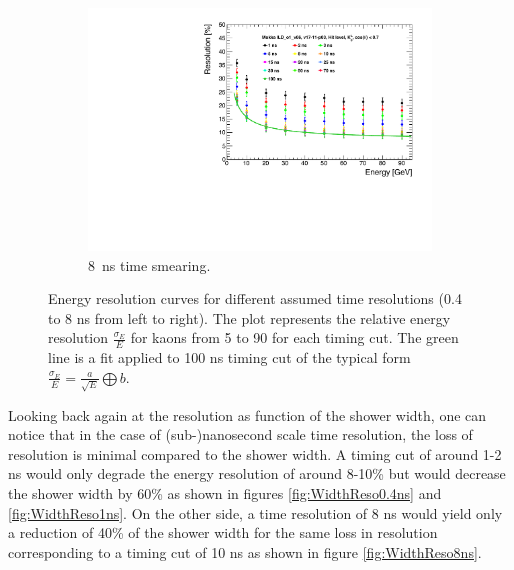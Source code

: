 \begin{figure}[htbp!]
\begin{minipage}{1\textwidth}
  \end{minipage}
  \begin{subfigure}[t]{0.5\textwidth}
    \centering
    \includegraphics[width=1\linewidth]{chap6/fig_TimingILD/8ns_Smearing/ShowerResoAbsolute_TimeCuts_Smearing8ns}
    \caption{\SI{8}{\nano\second} time smearing.}  \label{fig:Reso8ns}
  \end{subfigure}
  \caption{Energy resolution curves for different assumed time resolutions (0.4 to 8 ns from left to right). The plot represents the relative energy resolution $\frac{\sigma_{E}}{E}$ for kaons from 5 to 90 \GeV for each timing cut. The green line is a fit applied to 100 ns timing cut of the typical form $\frac{\sigma_{E}}{E} = \frac{a}{\sqrt{E}} \bigoplus b$.}
\end{figure}

Looking back again at the resolution as function of the shower width, one can notice that in the case of (sub-)nanosecond scale time resolution, the loss of resolution is minimal compared to the shower width. A timing cut of around 1-2 ns would only degrade the energy resolution of around 8-10\% but would decrease the shower width by 60\% as shown in figures \ref{fig:WidthReso0.4ns} and \ref{fig:WidthReso1ns}. On the other side, a time resolution of 8 ns would yield only a reduction of 40\% of the shower width for the same loss in resolution corresponding to a timing cut of 10 ns as shown in figure \ref{fig:WidthReso8ns}.\\

